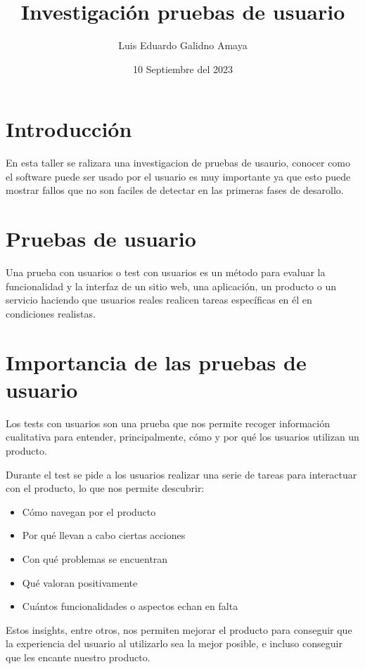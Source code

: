 \documentclass[11pt]{article}
\author{Luis Eduardo Galidno Amaya}
\date{10 Septiembre del 2023}
\title{Investigación pruebas de usuario}
\begin{document}
\tableofcontents\pagebreak
{}

\section{Introducción}
\label{sec:org7e284f0}
En esta taller se ralizara una investigacion de pruebas de usaurio, conocer
como el software puede ser usado por el usuario es muy importante ya que esto
puede mostrar fallos que no son faciles de detectar en las primeras fases de 
desarollo.

\section{Pruebas de usuario}
\label{sec:org1e4f29d}
\autocite{Narvaez_2023} Una prueba con usuarios o test con usuarios es un 
método para evaluar la funcionalidad y la interfaz de un sitio web, una 
aplicación, un producto o un servicio haciendo que usuarios reales realicen 
tareas específicas en él en condiciones realistas. 

\section{Importancia de las pruebas de usuario}
\label{sec:org5b410b3}
\autocite{Abizanda_2023} Los tests con usuarios son una prueba que nos
permite recoger información cualitativa para entender, principalmente, cómo y 
por qué los usuarios utilizan un producto.

Durante el test se pide a los usuarios realizar una serie de tareas para
interactuar con el producto, lo que nos permite descubrir:

\begin{itemize}
\item Cómo navegan por el producto
\item Por qué llevan a cabo ciertas acciones
\item Con qué problemas se encuentran
\item Qué valoran positivamente
\item Cuántos funcionalidades o aspectos echan en falta
\end{itemize}

Estos insights, entre otros, nos permiten mejorar el producto para conseguir 
que la experiencia del usuario al utilizarlo sea la mejor posible, e incluso 
conseguir que les encante nuestro producto.
\end{document}
